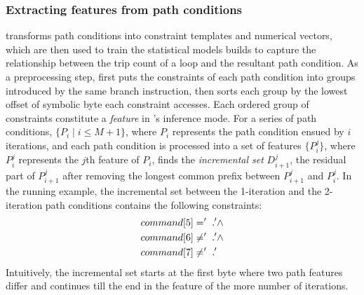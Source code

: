 \subsubsection{Extracting features from path conditions}
\label{sec:contraint-feature}
\lancet transforms path conditions into constraint templates and numerical vectors, which are then used to train the statistical models \lancet builds to capture the relationship between the trip count of a loop and the resultant path condition.
As a preprocessing step, \lancet first puts the constraints of each path condition into groups introduced by the same branch instruction, then sorts each group by the lowest offset of symbolic byte each constraint accesses.
Each ordered group of constraints constitute a {\em feature} in \lancet's inference mode.
For a series of path conditions, $\{P_i \mid i \le M+1\}$, where $P_i$ represents the path condition ensued by $i$ iterations, and each path condition is processed into a set of features $\{P_i^j\}$, where $P_i^j$ represents the $j$th feature of $P_i$, \lancet finds the {\em incremental set} $D_{i+1}^j$, the residual part of $P_{i+1}^j$ after removing the longest common prefix between $P_{i+1}^j$ and $P_i^j$.
In the running example, the incremental set between the 1-iteration and the 2-iteration path conditions contains the following constraints:
\begin{align*}
	command[5] &= '\vartextvisiblespace' \land\\
   	command[6] &\neq '\vartextvisiblespace' \land\\
   	command[7] &\neq '\vartextvisiblespace'
\end{align*}
Intuitively, the incremental set starts at the first byte where two path features differ and continues till the end in the feature of the more number of iterations.

